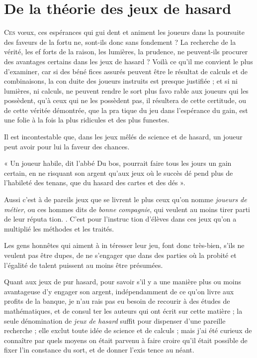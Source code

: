 \chapter
    [De la Théorie des Jeux de hasard]
    {De la théorie des jeux de hasard}

\lettrine{C}{es} vœux, ces espérances qui gui%
dent et animent les joueurs dans la
poursuite des faveurs de la fortu%
ne, sont-ils donc sans fondement ?
La recherche de la vérité, les ef%
forts de la raison, les lumières, la
prudence, ne peuvent-ils procurer
des avantages certains dans les jeux
de hasard ? Voilà ce qu'il me convient
le plus d'examiner, car si des béné%
fices assurés peuvent être le résultat
de calculs et de combinaisons, la con%
duite des joueurs instruits est presque
justifiée ; et si ni lumières, ni calculs,
ne peuvent rendre le sort plus favo%
rable aux joueurs qui les possèdent,
qu'à ceux qui ne les possèdent pas,
il résultera de cette certitude, ou de
cette véritée démontrée, que la pra%
tique du jeu dans l'espérance du gain,
est une folie à la fois la plus ridicules
et des plus funestes.

Il est incontestable que, dans les
jeux mêlés de science et de hasard, un
joueur peut avoir pour lui la faveur
des chances.

« Un joueur habile, dit l'abbé Du%
bos, pourrait faire tous les jours un
gain certain, en ne risquant son
argent qu'aux jeux où le succès dé%
pend plus de l'habileté des tenans,
que du hasard des cartes et des
dés ».

Aussi c'est à de pareils jeux que se
livrent le plus ceux qu'on nomme
\emph{joueurs de métier}, ou ces hommes
dits de \emph{bonne compagnie}, qui veulent
au moins tirer parti de leur réputa%
tion. . C'est pour l'instruc%
tion d'élèves dans ces jeux qu'on a
multiplié les méthodes et les traités.

Les gens honnêtes qui aiment à in%
téresser leur jeu, font donc très-bien,
s'ils ne veulent pas être dupes, de ne
s'engager que dans des parties où la
probité et l'égalité de talent puissent
au moins être présumées.

Quant aux jeux de pur hasard, pour
savoir s'il y a une manière plus ou
moins avantageuse d'y engager son
argent, indépendamment de ce qu'on
livre aux profits de la banque, je n'au%
rais pas eu besoin de recourir à des
études de mathématiques, et de consul%
ter les auteurs qui ont écrit sur cette
matière ; la seule dénomination de
\emph{jeux de hasard} suffit pour dispenser 
d'une pareille recherche ; elle exclut
toute idée de science et de calculs ;
mais j'ai été curieux de connaître par
quels moyens on était parvenu à faire
croire qu'il était possible de fixer l'in%
constance du sort, et de donner l'exis%
tence au néant.

